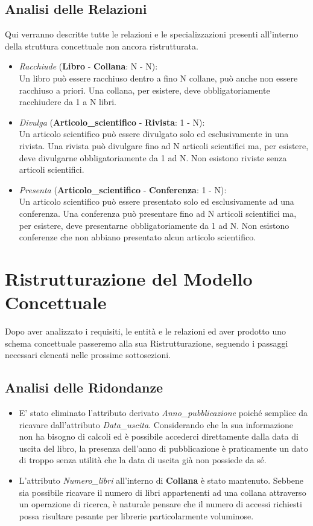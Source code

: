\documentclass[a4paper, 15pt, oneside]{article}
\begin{document}
	\subsection{Analisi delle Relazioni}
	Qui verranno descritte tutte le relazioni e le specializzazioni presenti all'interno della struttura concettuale non ancora ristrutturata.
	\begin{itemize}
		\item \textit{Racchiude} (\textbf{Libro} - \textbf{Collana}: N - N):\\Un libro può essere racchiuso dentro a fino N collane, può anche non essere racchiuso a priori. Una collana, per esistere, deve obbligatoriamente racchiudere da 1 a N libri.
		\item \textit{Divulga} (\textbf{Articolo\_scientifico} - \textbf{Rivista}: 1 - N):\\Un articolo scientifico può essere divulgato solo ed esclusivamente in una rivista. Una rivista può divulgare fino ad N articoli scientifici ma, per esistere, deve divulgarne obbligatoriamente da 1 ad N. Non esistono riviste senza articoli scientifici.
		\item \textit{Presenta} (\textbf{Articolo\_scientifico} - \textbf{Conferenza}: 1 - N):\\Un articolo scientifico può essere presentato solo ed esclusivamente ad una conferenza. Una conferenza può presentare fino ad N articoli scientifici ma, per esistere, deve presentarne obbligatoriamente da 1 ad N. Non esistono conferenze che non abbiano presentato alcun articolo scientifico.
	\end{itemize}
	\newpage
	\section{Ristrutturazione del Modello Concettuale}
	Dopo aver analizzato i requisiti, le entità e le relazioni ed aver prodotto uno schema concettuale passeremo alla sua Ristrutturazione, seguendo i passaggi necessari elencati nelle prossime sottosezioni.
	\subsection{Analisi delle Ridondanze}
	\begin{itemize}
		\item E' stato eliminato l'attributo derivato \textit{Anno\_pubblicazione} poiché semplice da ricavare dall'attributo \textit{Data\_uscita}. Considerando che la sua informazione non ha bisogno di calcoli ed è possibile accederci direttamente dalla data di uscita del libro, la presenza dell'anno di pubblicazione è praticamente un dato di troppo senza utilità che la data di uscita già non possiede da sé.
		\item L'attributo \textit{Numero\_libri} all'interno di \textbf{Collana} è stato mantenuto. Sebbene sia possibile ricavare il numero di libri appartenenti ad una collana attraverso un operazione di ricerca, è naturale pensare che il numero di accessi richiesti possa risultare pesante per librerie particolarmente voluminose.
	\end{itemize}
\end{document}
